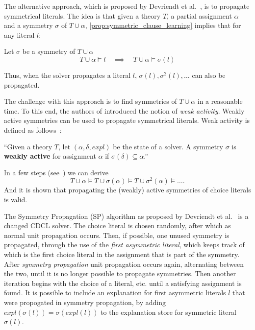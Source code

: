 	The alternative approach, which is proposed by Devriendt et al.~\cite{devriendt2012symmetry},
	is to propagate symmetrical literals.
	The idea is that given a theory $T$, a partial assignment $\alpha$ and a symmetry
	$\sigma$ of $T \cup \alpha$, \cref{prop:symmetric_clause_learning} implies
	that for any literal $l$:\\
	
	\begin{proposition}
		\label{prop:symmetryPropagation}
		Let $\sigma$ be a symmetry of $T \cup \alpha$
		\begin{equation*}
			T \cup \alpha \models l \quad
			\implies
			\quad T \cup \alpha \models \sigma(l)
		\end{equation*}
	\end{proposition}
	Thus, when the solver propagates a literal $l$, $\sigma(l), \sigma^2(l),\dots$ can also be propagated.

	The challenge with this approach is to find symmetries of $T \cup \alpha$ in a
	reasonable time.
	To this end, the authors of \cite{devriendt2012symmetry} introduced the notion of
	\emph{weak activity}.
	Weakly active symmetries can be used to propagate symmetrical literals.
	Weak activity is defined as follows~\cite{devriendt2012symmetry}:
	\begin{definition}
		\label{def:weaklyActive}
		``Given a theory $T$, let $(\alpha, \delta, expl)$ be the state of a solver.
		A symmetry $\sigma$ is \textbf{weakly active} for  assignment $\alpha$ if
		$\sigma(\delta)\subseteq \alpha$.''
	\end{definition}
	In a few steps (see~\cite{devriendt2012symmetry}) we can derive
	\begin{equation}
		T\cup \alpha \models T \cup \sigma(\alpha) \models T \cup \sigma^2(\alpha) \models \dots.
	\end{equation}
	And it is shown that propagating the (weakly) active symmetries of choice literals is valid.
	
	The Symmetry Propagation (SP) algorithm as proposed by Devriendt et al.~\cite{devriendt2012symmetry} is a changed CDCL solver.
	The choice literal is chosen randomly, after which as normal unit propagation occurs.
	Then, if possible, one unused symmetry is propagated,
	through the use of the \emph{first asymmetric literal},
	which keeps track of which is the first choice literal in the assignment that is part of the symmetry.
	After \emph{symmetry propagation} unit propagation occurs again, alternating between the two,
	until it is no longer possible to propagate symmetries.
	Then another iteration begins with the choice of a literal, etc. until a satisfying assignment is found.
	It is possible to include an explanation for first asymmetric literals $l$ that were propogated in symmetry propagation,
	by adding $expl(\sigma(l)) = \sigma(expl(l))$ to the explanation store for symmetric literal $\sigma(l)$.
